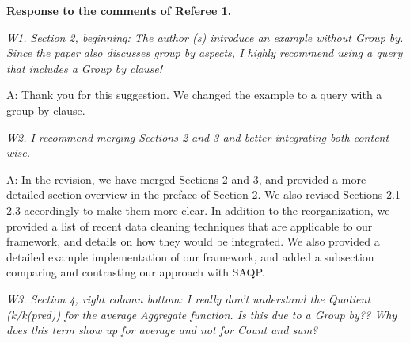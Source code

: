 


\vspace{1em}

{\noindent \bf Response to the comments of Referee 1.}

\vspace{1em}

\emph{W1. Section 2, beginning: The author (s) introduce an example without Group by. Since the paper also discusses group by aspects, I highly recommend using a query that includes a Group by clause!}

A: %
Thank you for this suggestion. We changed the example to a query with a group-by clause.


\mbox{}

\emph{W2. I recommend merging Sections 2 and 3 and better integrating both content wise.}

A: In the revision, we have merged Sections 2 and 3, and provided a more detailed section overview in the preface of Section 2. We also revised Sections 2.1-2.3 accordingly to make them more clear.
In addition to the reorganization, we provided a list of recent data cleaning techniques that are applicable to our framework, and details on how they would be integrated.
We also provided a detailed example implementation of our framework, and added a subsection comparing and contrasting our approach with SAQP.


\mbox{}

\emph{W3. Section 4, right column bottom: I really don't understand the Quotient (k/k(pred)) for the average Aggregate function. Is this due to a Group by?? Why does this term show up for average and not for Count and sum?}

